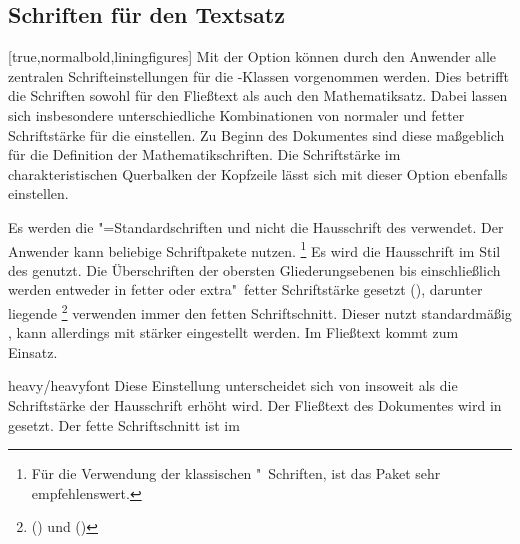 \begin{Declaration*}{}
\begin{Declaration*}{}
\begin{Declaration*}{}
\subsection{Schriften für den Textsatz}
%
%
%
\begin{Declaration}[%
  v2.02!\Option{cdfont=head};
  v2.02!\Option{cdfont=heavyhead};
  v2.03!\Option{cdfont=din};
  v2.03!\Option{cdfont=nodin};
  v2.05!\Option{cdfont=normalbold};
  v2.05!\Option{cdfont=heavybold};
  v2.06!\Option{cdfont=liningfigures};
  v2.06!\Option{cdfont=oldstylefigures};
  v2.06!\Option{cdfont=texgreek};
]{}[true,normalbold,liningfigures]%
\printdeclarationlist%
%
Mit der Option  können durch den Anwender alle zentralen 
Schrifteinstellungen für die \TUDScript-Klassen vorgenommen werden. Dies 
betrifft die Schriften sowohl für den Fließtext als auch den Mathematiksatz.
Dabei lassen sich insbesondere unterschiedliche Kombinationen von normaler und 
fetter Schriftstärke für die \OpenSans einstellen. Zu Beginn des Dokumentes 
sind diese maßgeblich für die Definition der Mathematikschriften. Die 
Schriftstärke im charakteristischen Querbalken der Kopfzeile lässt sich mit 
dieser Option ebenfalls einstellen.
%
\begin{values}{}
\itemfalse
  Es werden die "=Standardschriften und nicht die Hausschrift 
  des \CDs verwendet. Der Anwender kann beliebige Schriftpakete nutzen.%
  \footnote{%
    Für die Verwendung der klassischen "~Schriften, ist das Paket 
     sehr empfehlenswert.%
  }
  Es wird die Hausschrift \OpenSans im Stil des \CDs genutzt. Die Überschriften 
  der obersten Gliederungsebenen bis einschließlich  
  werden entweder in fetter oder extra"~fetter Schriftstärke gesetzt 
  (), darunter liegende%
  \footnote{%
    () und 
    ()%
  } verwenden immer den fetten Schriftschnitt. Dieser nutzt standardmäßig 
  , kann allerdings mit  
  stärker eingestellt werden. Im Fließtext kommt  zum 
  Einsatz.
\item[heavy/heavyfont]
  Diese Einstellung unterscheidet sich von  insoweit als 
  die Schriftstärke der Hausschrift erhöht wird. Der Fließtext des Dokumentes 
  wird in  gesetzt. Der fette Schriftschnitt ist im 

\end{values}
\end{Declaration}
\end{Declaration*}
\end{Declaration*}
\end{Declaration*}

